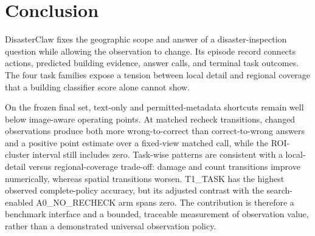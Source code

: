 \section{Conclusion}
DisasterClaw fixes the geographic scope and answer of a disaster-inspection question while allowing the observation to change. Its episode record connects actions, predicted building evidence, answer calls, and terminal task outcomes. The four task families expose a tension between local detail and regional coverage that a building classifier score alone cannot show.

On the frozen final set, text-only and permitted-metadata shortcuts remain well below image-aware operating points. At matched recheck transitions, changed observations produce both more wrong-to-correct than correct-to-wrong answers and a positive point estimate over a fixed-view matched call, while the ROI-cluster interval still includes zero. Task-wise patterns are consistent with a local-detail versus regional-coverage trade-off: damage and count transitions improve numerically, whereas spatial transitions worsen. T1\_TASK has the highest observed complete-policy accuracy, but its adjusted contrast with the search-enabled A0\_NO\_RECHECK arm spans zero. The contribution is therefore a benchmark interface and a bounded, traceable measurement of observation value, rather than a demonstrated universal observation policy.
